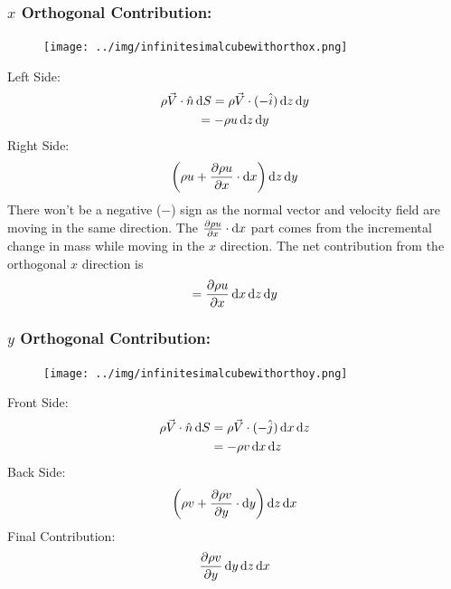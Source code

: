 \documentclass[class=report, crop=false, 12pt,a4paper]{standalone}
\begin{document}
\subsubsection{$x$ Orthogonal Contribution:}
\begin{figure}[H]
  \centering
  \texttt{[image: ../img/infinitesimalcubewithorthox.png]}
\end{figure}
Left Side:
\begin{gather}
  \rho \vec{V} \cdot \hat{n} \dif S = \rho \vec{V} \cdot (-\hat{i}) \dif z \dif y\\
  = - \rho u \dif z \dif y
\end{gather}
Right Side:
\begin{gather}
  \left(\rho u + \frac{\partial \rho u}{\partial x} \cdot \dif x \right) \dif z \dif y
\end{gather}
There won't be a negative ($-$) sign as the normal vector and velocity field are moving in the same direction. The $\frac{\partial \rho u}{\partial x} \cdot \dif x$ part comes from the incremental change in mass while moving in the $x$ direction.
The net contribution from the orthogonal $x$ direction is
\begin{gather}
  = \frac{\partial \rho u}{\partial x} \dif x \dif z \dif y
  \label{xorthogonalcontribution}
\end{gather}
\subsubsection{$y$ Orthogonal Contribution:}
\begin{figure}[H]
  \centering
  \texttt{[image: ../img/infinitesimalcubewithorthoy.png]}
\end{figure}
Front Side:
\begin{align}
  \rho \vec{V} \cdot \hat{n} \dif S &= \rho \vec{V} \cdot (- \hat{j}) \dif x \dif z\\
  &= -\rho v \dif x \dif z
\end{align}
Back Side:
\begin{gather}
  \left(\rho v + \frac{\partial \rho v}{\partial y} \cdot \dif y \right) \dif z \dif x
\end{gather}
Final Contribution:
\begin{gather}
  \frac{\partial \rho v}{\partial y} \dif y \dif z \dif x
  \label{yorthogonalcontribution} 
\end{gather}
\end{document}
